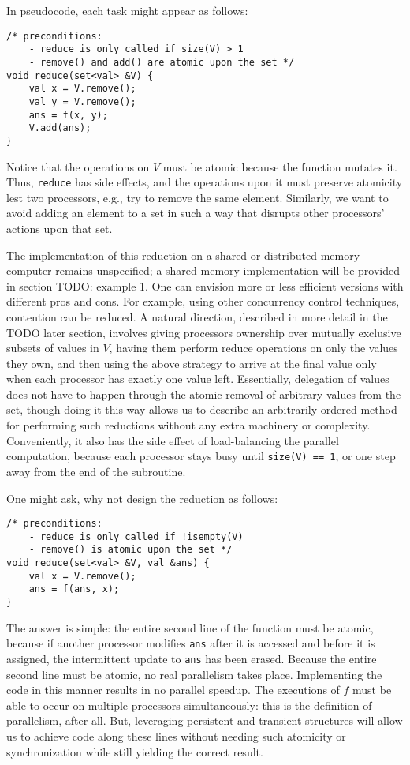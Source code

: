 In pseudocode, each task might appear as follows:
\begin{lstlisting}
/* preconditions: 
    - reduce is only called if size(V) > 1
    - remove() and add() are atomic upon the set */
void reduce(set<val> &V) {
    val x = V.remove();
    val y = V.remove();
    ans = f(x, y);
    V.add(ans);
}
\end{lstlisting}

Notice that the operations on $V$ must be atomic because the function mutates
it.  Thus, \texttt{reduce} has side effects, and the operations upon it must
preserve atomicity lest two processors, e.g., try to remove the same element.
Similarly, we want to avoid adding an element to a set in such a way that
disrupts other processors' actions upon that set.

The implementation of this reduction on a shared or distributed memory computer
remains unspecified; a shared memory implementation will be provided in section
{TODO: example 1}. One can envision more or less efficient versions with
different pros and cons. For example, using other concurrency control
techniques, contention can be reduced. A natural direction, described in more
detail in the TODO later section, involves giving processors ownership over
mutually exclusive subsets of values in $V$, having them perform reduce
operations on only the values they own, and then using the above strategy to
arrive at the final value only when each processor has exactly one value left.
Essentially, delegation of values does not have to happen through the atomic
removal of arbitrary values from the set, though doing it this way allows us to
describe an arbitrarily ordered method for performing such reductions without
any extra machinery or complexity. Conveniently, it also has the side effect of
load-balancing the parallel computation, because each processor stays busy until
\texttt{size(V) == 1}, or one step away from the end of the subroutine.

One might ask, why not design the reduction as follows:
\begin{lstlisting}
/* preconditions: 
    - reduce is only called if !isempty(V)
    - remove() is atomic upon the set */
void reduce(set<val> &V, val &ans) {
    val x = V.remove();
    ans = f(ans, x);
}
\end{lstlisting}

The answer is simple: the entire second line of the function must be atomic,
because if another processor modifies \texttt{ans} after it is accessed and
before it is assigned, the intermittent update to \texttt{ans} has been erased.
Because the entire second line must be atomic, no real parallelism takes place.
Implementing the code in this manner results in no parallel speedup. The
executions of $f$ must be able to occur on multiple processors simultaneously:
this is the definition of parallelism, after all. But, leveraging persistent and
transient structures will allow us to achieve code along these lines without
needing such atomicity or synchronization while still yielding the correct
result.

